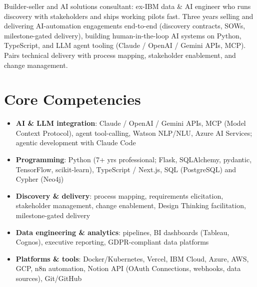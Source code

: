 \documentclass[11pt,a4paper,sans]{moderncv}
\begin{document}
\makecvtitle


\vspace{6pt}
\small{Builder-seller and AI solutions consultant: ex-IBM data \& AI engineer who runs discovery with stakeholders and ships working pilots fast. Three years selling and delivering AI-automation engagements end-to-end (discovery contracts, SOWs, milestone-gated delivery), building human-in-the-loop AI systems on Python, TypeScript, and LLM agent tooling (Claude / OpenAI / Gemini APIs, MCP). Pairs technical delivery with process mapping, stakeholder enablement, and change management.}


\section{Core Competencies}
\vspace{1pt}
\begin{itemize}

\item \textbf{AI \& LLM integration}: Claude / OpenAI / Gemini APIs, MCP (Model Context Protocol), agent tool-calling, Watson NLP/NLU, Azure AI Services; agentic development with Claude Code

\item \textbf{Programming}: Python (7+ yrs professional; Flask, SQLAlchemy, pydantic, TensorFlow, scikit-learn), TypeScript / Next.js, SQL (PostgreSQL) and Cypher (Neo4j)

\item \textbf{Discovery \& delivery}: process mapping, requirements elicitation, stakeholder management, change enablement, Design Thinking facilitation, milestone-gated delivery

\item \textbf{Data engineering \& analytics}: pipelines, BI dashboards (Tableau, Cognos), executive reporting, GDPR-compliant data platforms

\item \textbf{Platforms \& tools}: Docker/Kubernetes, Vercel, IBM Cloud, Azure, AWS, GCP, n8n automation, Notion API (OAuth Connections, webhooks, data sources), Git/GitHub

\end{itemize}
\end{document}
